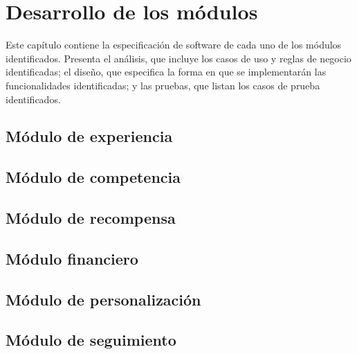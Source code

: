 
\chapter{Desarrollo de los módulos}\label{ch:modulos}

 Este capítulo contiene la especificación de software de cada uno de los módulos
 identificados. Presenta el análisis, que incluye los casos de uso y reglas de
 negocio identificadas; el diseño, que especifica la forma en que se implementarán
 las funcionalidades identificadas; y las pruebas, que listan los casos de prueba
 identificados.


    \section{Módulo de experiencia}\label{mod:exp}
    

    \section{Módulo de competencia}\label{mod:comp}
    

    \section{Módulo de recompensa}\label{mod:recomp}

    \section{Módulo financiero}\label{mod:financ}

    \section{Módulo de personalización}\label{mod:pers}

    \section{Módulo de seguimiento}\label{mod:seguim}
